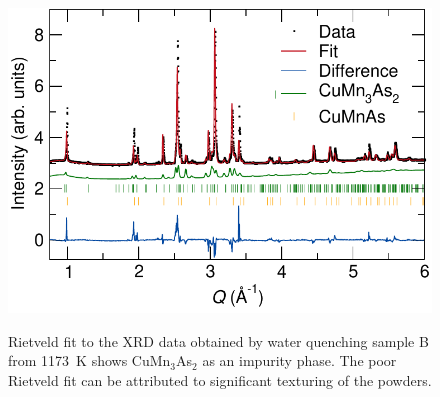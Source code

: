 \documentclass[10pt,doublespacing,edeposit]{uiucthesis2020}
\begin{document}
\begin{mainmatter}
\begin{figure}
\centering\includegraphics[width=0.7\columnwidth]{figures/ch7/quenched_samples_cropped.pdf} \\
\caption{\label{fig:quenched_samples}
Rietveld fit to the XRD data obtained by water quenching sample B from 1173~K shows CuMn$_3$As$_2$ as an impurity phase. The poor Rietveld fit can be attributed to significant texturing of the powders.%
} 
\end{figure}




\end{mainmatter}
\end{document}
